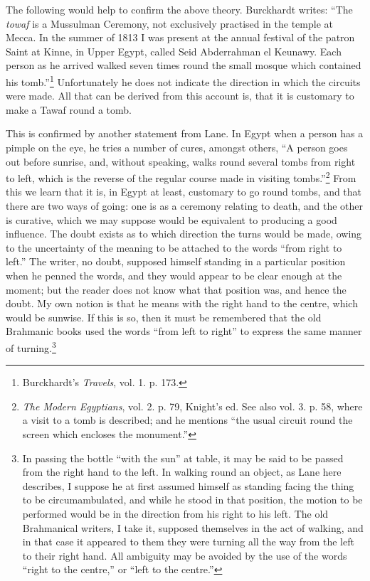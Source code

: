 \documentclass[a4paper, 11pt, oneside, polutonikogreek, english]{article}
\begin{document}
The following would help to confirm the above theory. Burckhardt writes: ``The \emph{towaf} is a Mussulman Ceremony, not exclusively practised in the temple at Mecca. In the summer of 1813 I was present at the annual festival of the patron Saint at Kinne, in Upper Egypt, called Seid Abderrahman el Keunawy. Each person as he arrived walked seven times round the small mosque which contained his tomb.''\footnote{Burckhardt's \emph{Travels}, vol. 1. p. 173.} Unfortunately he does not indicate the direction in which the circuits were made. All that can be derived from this account is, that it is customary to make a Tawaf round a tomb.

This is confirmed by another statement from Lane. In Egypt when a person has a pimple on the eye, he tries a number of cures, amongst others, ``A person goes out before sunrise, and, without speaking, walks round several tombs from right to left, which is the reverse of the regular course made in visiting tombs.''\footnote{\emph{The Modern Egyptians}, vol. 2. p. 79, Knight's ed. See also vol. 3. p. 58, where a visit to a tomb is described; and he mentions ``the usual circuit round the screen which encloses the monument.''} From this we learn that it is, in Egypt at least, customary to go round tombs, and that there are two ways of going: one is as a ceremony relating to death, and the other is curative, which we may suppose would be equivalent to producing a good influence. The doubt exists as to which direction the turns would be made, owing to the uncertainty of the meaning to be attached to the words ``from right to left.'' The writer, no doubt, supposed himself standing in a particular position when he penned the words, and they would appear to be clear enough at the moment; but the reader does not know what that position was, and hence the doubt. My own notion is that he means with the right hand to the centre, which would be sunwise. If this is so, then it must be remembered that the old Brahmanic books used the words ``from left to right'' to express the same manner of turning.\footnote{In passing the bottle ``with the sun'' at table, it may be said to be passed from the right hand to the left. In walking round an object, as Lane here describes, I suppose he at first assumed himself as standing facing the thing to be circumambulated, and while he stood in that position, the motion to be performed would be in the direction from his right to his left. The old Brahmanical writers, I take it, supposed themselves in the act of walking, and in that case it appeared to them they were turning all the way from the left to their right hand. All ambiguity may be avoided by the use of the words ``right to the centre,'' or ``left to the centre.''}
\end{document}
